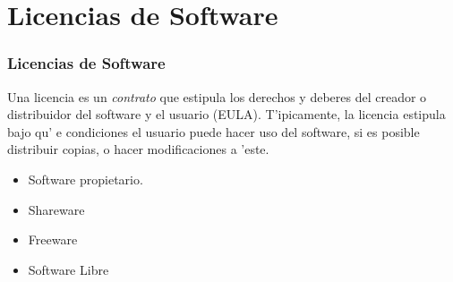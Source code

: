 \documentclass{beamer}
\begin{document}
\section{Licencias de Software}
\begin{frame}[fragile]\frametitle{Licencias de Software}
Una licencia es un \textit{contrato} que estipula los derechos y deberes del creador o distribuidor del software y el usuario (EULA). T'ipicamente, la licencia estipula bajo qu' e condiciones el usuario puede hacer uso del software, si es posible distribuir copias, o hacer modificaciones a 'este.
\begin{itemize}
\item Software propietario. 
\item Shareware
\item Freeware
\item Software Libre
\end{itemize}
\end{frame}
\end{document}

